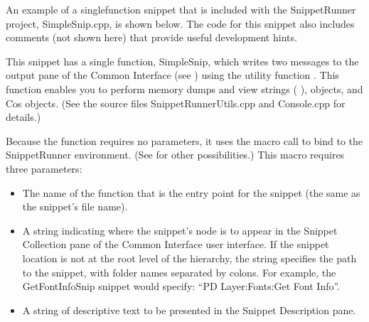 \documentclass[letterpaper,12pt,english,openany,oneside]{sphinxmanual}
\begin{document}
An example of a single\sphinxhyphen{}function snippet that is included with the SnippetRunner project, SimpleSnip.cpp, is shown below. The code for this snippet also includes comments (not shown here) that provide useful development hints.

\begin{sphinxVerbatim}[commandchars=\\\{\}]

  

   
\end{sphinxVerbatim}

This snippet has a single function, SimpleSnip, which writes two messages to the output pane of the Common Interface (see ) using the utility function  . This function enables you to perform memory dumps and view strings ( ),  objects, and Cos objects. (See the source files SnippetRunnerUtils.cpp and Console.cpp for details.)

Because the  function requires no parameters, it uses the macro call  to bind to the SnippetRunner environment. (See  for other possibilities.) This macro requires three parameters:
\begin{itemize}
\item {} 
The name of the function that is the entry point for the snippet (the same as the snippet’s file name).

\item {} 
A string indicating where the snippet’s node is to appear in the Snippet Collection pane of the Common Interface user interface. If the snippet location is not at the root level of the hierarchy, the string specifies the path to the snippet, with folder names separated by colons. For example, the GetFontInfoSnip snippet would specify: “PD Layer:Fonts:Get Font Info”.

\item {} 
A string of descriptive text to be presented in the Snippet Description pane.

\end{itemize}
\end{document}

